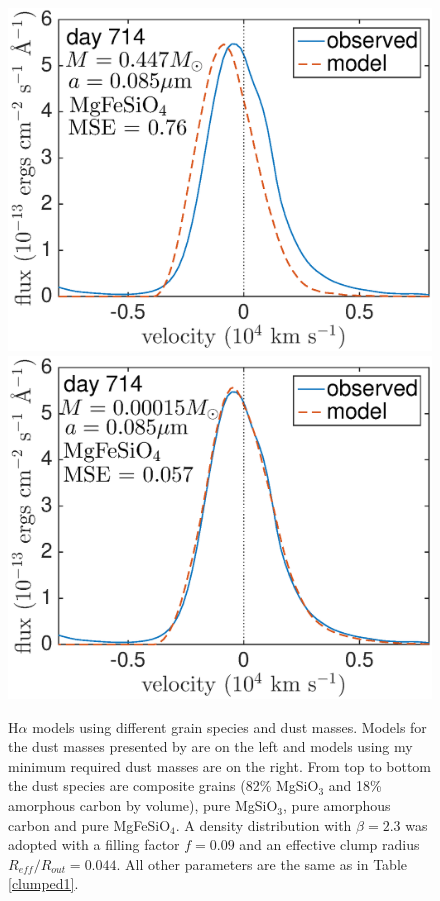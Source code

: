 \begin{figure}
\includegraphics[trim =0 0 0 0,clip=true,scale=0.34]{chapters/chapter5/images/silicates_take2/MgFeSiO4_Dwek_Ha.eps}
\hspace{3mm}
\includegraphics[trim =0 0 0 -10,clip=true,scale=0.35]{chapters/chapter5/images/silicates_take2/MgFeSiO4_bestfit_Ha.eps}
\caption{H$\alpha$ models using different grain species and dust masses.   
Models for the dust masses presented by \citet{Dwek2015} are on the left and models 
using my minimum required dust masses are on the right.  From top to 
bottom the dust species are composite grains (82\% MgSiO$_3$ and 18\% 
amorphous carbon by volume), pure MgSiO$_3$, pure amorphous carbon and pure 
MgFeSiO$_4$. A density distribution with $\beta=2.3$ was adopted with a 
filling factor $f=0.09$ and an effective clump radius 
$R_{eff}/R_{out}=0.044$.  All other parameters are the same as in Table 
\ref{clumped1}.}
\label{Dwek_models_Ha}
\end{figure}


